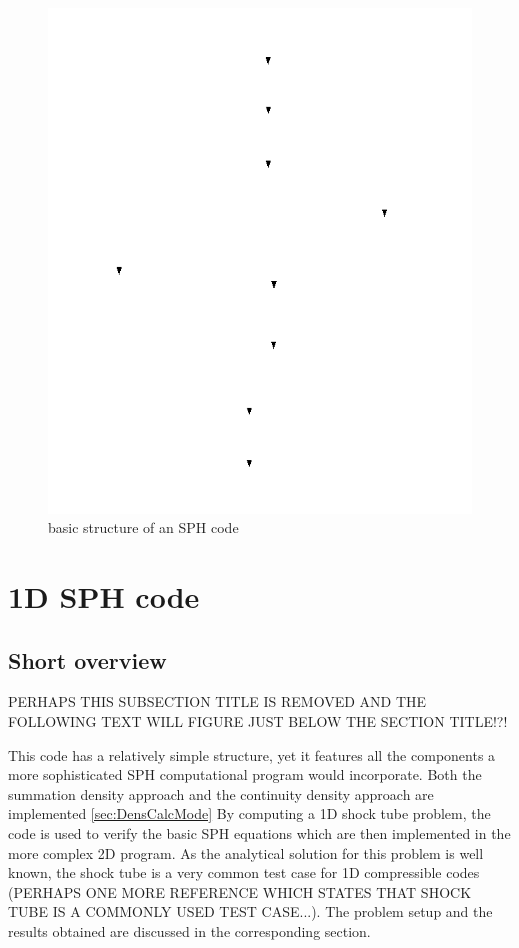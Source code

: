 \documentclass{report}
\begin{document}
\begin{figure}[h]
  \centering
      \includegraphics[width=1.0\textwidth]{Graphics/general_structure_SPH}
  \caption{basic structure of an SPH code}
  \label{fig:BasicSphCode}
\end{figure}

\section{1D SPH code}

\subsection{Short overview}
PERHAPS THIS SUBSECTION TITLE IS REMOVED AND THE FOLLOWING TEXT WILL FIGURE JUST BELOW THE SECTION TITLE!?!

This code has a relatively simple structure, yet it features all the components
a more sophisticated SPH computational program would incorporate. Both the summation 
density approach and the continuity density approach are implemented 
\ref{sec:DensCalcMode} By computing a 1D shock tube problem, the code is used to verify 
the basic SPH equations which are then implemented in the more complex 2D program. 
As the analytical solution for this problem is well known, the shock tube is a very 
common test case for 1D compressible codes \cite{Sod1978} (PERHAPS ONE MORE REFERENCE WHICH STATES THAT SHOCK TUBE IS A COMMONLY USED TEST CASE...). 
The problem setup and the results obtained are discussed in the corresponding section.
\end{document}
